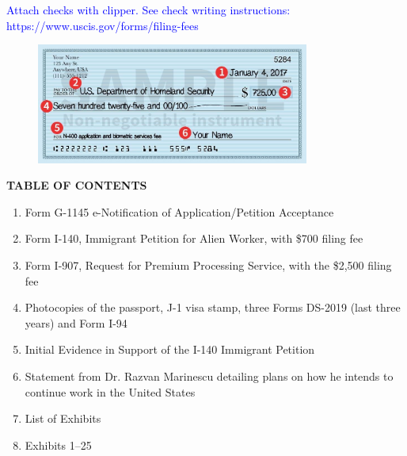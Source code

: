 \documentclass[11pt]{article}
\title{}
\date{}
\begin{document}
\newcommand{\tc}[1]{\textcolor{blue}{#1}}



\tc{Attach checks with clipper. See check writing instructions: https://www.uscis.gov/forms/filing-fees}

\begin{figure}
\includegraphics[width=0.8\textwidth]{aux/check.jpeg}
\end{figure}

\vspace*{5em}



\begin{center}
\Large{\textbf{TABLE OF CONTENTS}} 
\end{center}



\begin{enumerate}
 \item Form G-1145 e-Notification of Application/Petition Acceptance
 \item Form I-140, Immigrant Petition for Alien Worker, with \$700 filing fee
 \item Form I-907, Request for Premium Processing Service, with the \$2,500 filing fee
 \item Photocopies of the passport, J-1 visa stamp, three Forms DS-2019 (last three years) and Form I-94
 \item Initial Evidence in Support of the I-140 Immigrant Petition
 \item Statement from Dr. Razvan Marinescu detailing plans on how he intends to continue work in the United States
 \item List of Exhibits
 \item Exhibits 1--25
\end{enumerate}


\pagebreak


\end{document}
